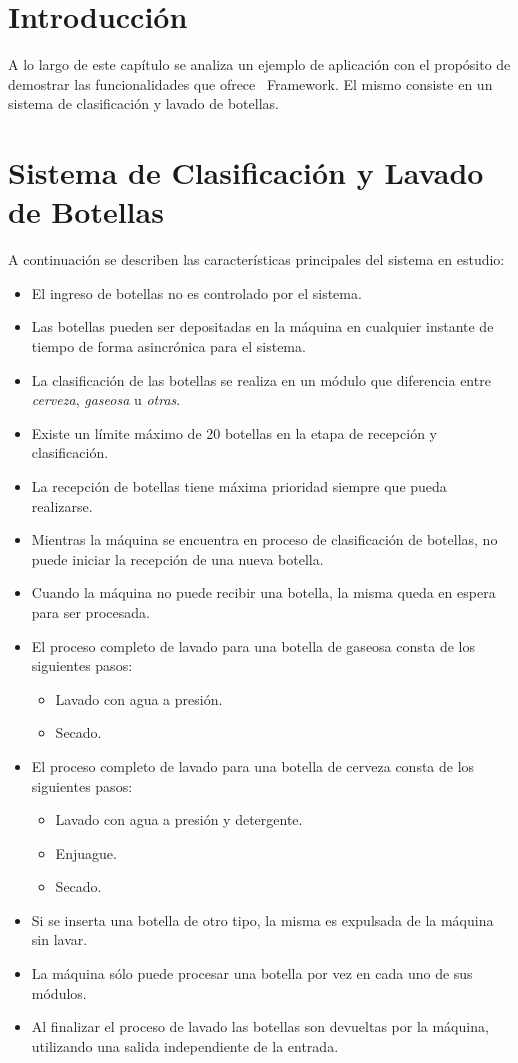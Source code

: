 \section{Introducción}
A lo largo de este capítulo se analiza un ejemplo de aplicación con el propósito
de demostrar las funcionalidades que ofrece \nombreFramework \ Framework. El
mismo consiste en un sistema de clasificación y lavado de botellas.

\section {Sistema de Clasificación y Lavado de Botellas}
A continuación se describen las características principales del sistema en
estudio:

\begin{itemize}
  \item El ingreso de botellas no es controlado por el sistema.
  \item Las botellas pueden ser depositadas en la máquina en cualquier instante
  de tiempo de forma asincrónica para el sistema.
  \item La clasificación de las botellas se realiza en un módulo que
  diferencia entre \emph{cerveza}, \emph{gaseosa} u \emph{otras}.
  \item Existe un límite máximo de 20 botellas en la etapa de
  recepción y clasificación.
  \item La recepción de botellas tiene máxima prioridad siempre que pueda
  realizarse.
  \item Mientras la máquina se encuentra en proceso de clasificación de
  botellas, no puede iniciar la recepción de una nueva botella.
  \item Cuando la máquina no puede recibir una botella, la misma queda en espera
  para ser procesada.
  \item El proceso completo de lavado para una botella de gaseosa consta de los
  siguientes pasos:
      \begin{itemize} 
        \item Lavado con agua a presión.
        \item Secado.
      \end{itemize}
  \item El proceso completo de lavado para una botella de cerveza consta de los
  siguientes pasos:
      \begin{itemize} 
        \item Lavado con agua a presión y detergente.
        \item Enjuague.
        \item Secado.
      \end{itemize}
  \item Si se inserta una botella de otro tipo, la misma es expulsada de la
    máquina sin lavar.
  \item La máquina sólo puede procesar una botella por vez en cada uno de sus
  módulos.
  \item Al finalizar el proceso de lavado las botellas son devueltas por la
  máquina, utilizando una salida independiente de la entrada.
  
\end{itemize}

